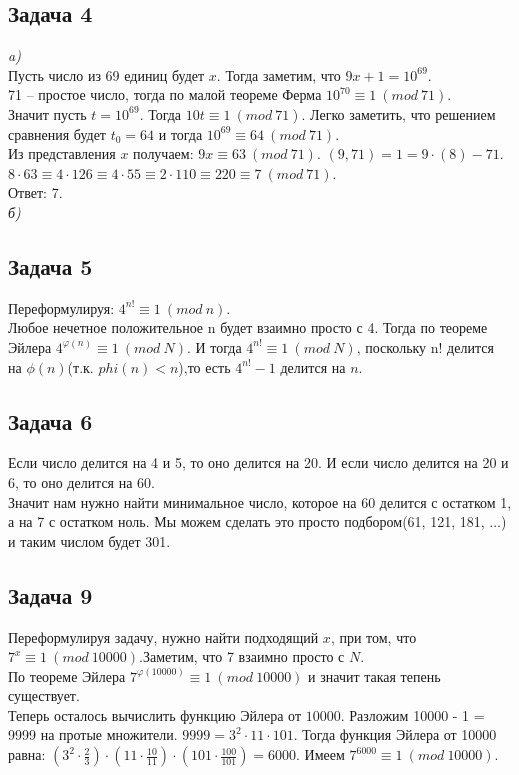 	
	\subsection{Задача 4}
	\textit{a)} \\
	Пусть число из 69 единиц будет $x$. Тогда заметим, что $9x + 1 = 10^{69}$. \\
	71 -- простое число, тогда по малой теореме Ферма $10^{70} \equiv 1\ (mod\ 71)$. \\
	Значит пусть $t = 10^{69}$. Тогда $10t \equiv 1\ (mod\ 71)$. Легко заметить, что решением сравнения будет $t_0 = 64$ и тогда $10^{69} \equiv 64\ (mod\ 71)$.\\
	Из представления $x$ получаем: $9x \equiv 63\ (mod\ 71)$. $(9, 71) = 1 = 9 \cdot(8) - 71$.
	$8 \cdot 63 \equiv 4 \cdot 126 \equiv 4 \cdot 55 \equiv 2 \cdot 110 \equiv 220 \equiv 7\ (mod\ 71) $.\\
	Ответ: 7. \\
	\textit{б)} \\
	
	\subsection{Задача 5}
	Переформулируя: $4^{n!} \equiv 1\ (mod\ n)$.\\
	Любое нечетное положительное n будет взаимно просто с 4. Тогда по теореме Эйлера $4^{\varphi(n)} \equiv 1\ (mod\ N)$. И тогда $4^{n!} \equiv 1\ (mod\ N)$, поскольку n! делится на $\phi(n)$(т.к. $phi(n) < n$),то есть $4^{n!} -1$ делится на $n$.
	
	\subsection{Задача 6}
	Если число делится на 4 и 5, то оно делится на 20. И если число делится на 20 и 6, то оно делится на 60.\\
	Значит нам нужно найти минимальное число, которое на 60 делится с остатком 1, а на 7 с остатком ноль. Мы можем сделать это просто подбором(61, 121, 181, $\ldots$) и таким числом будет 301. 
	
	\subsection{Задача 9}
	Переформулируя задачу, нужно найти подходящий $x$, при том, что $7^x \equiv 1\ (mod\ 10000)$.Заметим, что 7 взаимно просто с $N$.\\
	По теореме Эйлера $7^{\varphi(10000)} \equiv 1\ (mod\ 10000)$ и значит такая тепень существует.\\
	Теперь осталось вычислить функцию Эйлера от $10000$. Разложим 10000 - 1 = 9999 на протые множители. $9999 = 3^2 \cdot 11 \cdot 101$. Тогда функция Эйлера от 10000 равна: $(3^2 \cdot \frac{2}{3}) \cdot (11 \cdot \frac{10}{11}) \cdot (101 \cdot \frac{100}{101}) = 6000$.
	Имеем $7^{6000} \equiv 1\ (mod\ 10000)$.

